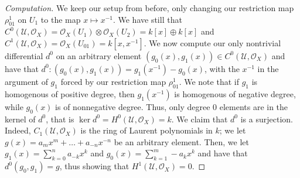 \documentclass[english,letter,doublesided]{article}
\newcommand{\OO}{\mathcal{O}}
\theoremstyle{remark}
\theoremstyle{definition}
\newcommand{\ucal}{{ \mathcal{U}}}
\begin{document}
\begin{proof}[Computation]
	We keep our setup from before, only changing our restriction map $\rho_{01}^1$ on $U_1$ to the map $x\mapsto x^{-1}$. We have still that $C^0(\ucal,\OO_X)=\OO_X(U_1)\otimes \OO_X(U_2)=k[x]\oplus k[x]$ and $C^1(\ucal,\OO_X)=\OO_X(U_{01})=k[x,x^{-1}]$. We now compute our only nontrivial differential $d^0$ on an arbitrary element $(g_0(x),g_1(x))\in C^0(\ucal,\OO_X)$ and have that $d^0:(g_0(x),g_1(x))=g_1(x^{-1})-g_0(x)$, with the $x^{-1}$ in the argument of $g_1$ forced by our restriction map $\rho_{01}^1$. We note that if $g_1$ is homogenous of positive degree, then $g_1(x^{-1})$ is homogenous of negative degree, while $g_0(x)$ is of nonnegative degree. Thus, only degree 0 elements are in the kernel of $d^0$, that is $\ker d^0=H^0(\ucal,\OO_X)=k$. We claim that $d^0$ is a surjection. Indeed, $C_1(\ucal,\OO_X)$ is the ring of Laurent polynomials in $k$; we let $g(x)=a_mx^m+\dots+a_{-n}x^{-n}$ be an arbitrary element. Then, we let $g_1(x)=\sum_{k=0}^na_{-k}x^k$ and $g_0(x)=\sum_{k=1}^m-a_{k}x^k$ and have that $d^0(g_0,g_1)=g$, thus showing that $H^1(\ucal, \OO_X)=0$. \end{proof}
\printbibliography
\end{document}
